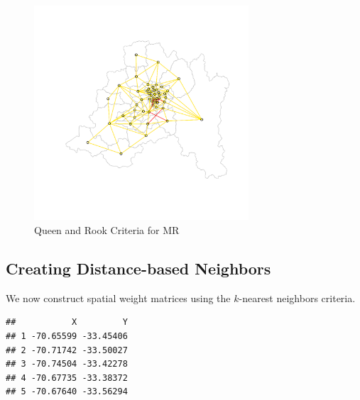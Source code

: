 \begin{figure}
  \caption{Queen and Rook Criteria for MR}
    \label{fig:Queen-Rook}
\begin{knitrout}
\color{fgcolor}

{\centering \includegraphics[width=8cm,height=8cm]{figure/plot-queen-rookT-1} 

}


\end{knitrout}
\end{figure}

\subsection{Creating Distance-based Neighbors}

We now construct spatial weight matrices using the $k$-nearest neighbors criteria. 

\begin{knitrout}
\color{fgcolor}\begin{kframe}
\begin{alltt}
 \hlstd{)}                                       
\end{alltt}
\begin{verbatim}
##           X         Y
## 1 -70.65599 -33.45406
## 2 -70.71742 -33.50027
## 3 -70.74504 -33.42278
## 4 -70.67735 -33.38372
## 5 -70.67640 -33.56294
\end{verbatim}
\begin{alltt}
 \hlkwb{<-}   \hlstd{=} \hlstd{,}  \hlstd{=} \hlstd{)}  
 \hlkwb{<-}   \hlstd{=} \hlstd{,}  \hlstd{=} \hlstd{)}  
\end{alltt}
\end{kframe}
\end{knitrout}

